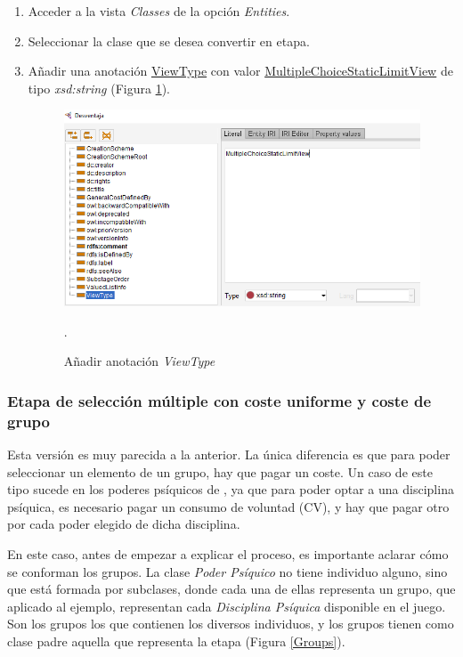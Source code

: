 \begin{enumerate}
    \item Acceder a la vista \textit{Classes} de la opción \textit{Entities}.
    \item Seleccionar la clase que se desea convertir en etapa.
    \item Añadir una anotación \underline{ViewType} con valor \underline{MultipleChoiceStaticLimitView} de tipo \textit{xsd:string}
    (Figura \ref*{MultipleChoice_1}).
    \begin{figure}[H]
        \centering
        \includegraphics[scale=0.6]{Figures/Protege/MultipleChoice_1.png}
        \caption{Añadir anotación \textit{ViewType}}.
        \label{MultipleChoice_1}
    \end{figure}
\end{enumerate}

\subsubsection{Etapa de selección múltiple con coste uniforme y coste de grupo}\label{MultipleChoiceUniformCostGroup}
Esta versión es muy parecida a la anterior. La única diferencia es que para poder seleccionar un elemento de un grupo, hay que pagar 
un coste. Un caso de este tipo sucede en los poderes psíquicos de \anima, ya que para poder optar a una disciplina psíquica, es 
necesario pagar un consumo de voluntad (CV), y hay que pagar otro por cada poder elegido de dicha disciplina.\medskip

En este caso, antes de empezar a explicar el proceso, es importante aclarar cómo se conforman los grupos. La clase \textit{Poder Psíquico}
no tiene individuo alguno, sino que está formada por subclases, donde cada una de ellas representa un grupo, que aplicado al ejemplo, 
representan cada \textit{Disciplina Psíquica} disponible en el juego. Son los grupos los que contienen los diversos individuos, 
y los grupos tienen como clase padre aquella que representa la etapa (Figura \ref*{Groups}).

